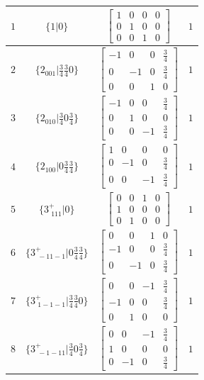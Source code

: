 \documentclass[fleqn,8pt]{jsarticle}
\begin{document}
\begin{longtable}{cccc}
$ 1 $ & $ \{1|0\} $ & $ \begin{bmatrix} 1 & 0 & 0 & 0 \\ 0 & 1 & 0 & 0 \\ 0 & 0 & 1 & 0 \end{bmatrix} $ & $ 1 $ \\ \hline
$ 2 $ & $ \{2{}_{001}|\frac{3}{4} \frac{3}{4} 0\} $ & $ \begin{bmatrix} -1 & 0 & 0 & \frac{3}{4} \\ 0 & -1 & 0 & \frac{3}{4} \\ 0 & 0 & 1 & 0 \end{bmatrix} $ & $ 1 $ \\ \hline
$ 3 $ & $ \{2{}_{010}|\frac{3}{4} 0 \frac{3}{4}\} $ & $ \begin{bmatrix} -1 & 0 & 0 & \frac{3}{4} \\ 0 & 1 & 0 & 0 \\ 0 & 0 & -1 & \frac{3}{4} \end{bmatrix} $ & $ 1 $ \\ \hline
$ 4 $ & $ \{2{}_{100}|0 \frac{3}{4} \frac{3}{4}\} $ & $ \begin{bmatrix} 1 & 0 & 0 & 0 \\ 0 & -1 & 0 & \frac{3}{4} \\ 0 & 0 & -1 & \frac{3}{4} \end{bmatrix} $ & $ 1 $ \\ \hline
$ 5 $ & $ \{3^{+}_{\,\,111}|0\} $ & $ \begin{bmatrix} 0 & 0 & 1 & 0 \\ 1 & 0 & 0 & 0 \\ 0 & 1 & 0 & 0 \end{bmatrix} $ & $ 1 $ \\ \hline
$ 6 $ & $ \{3^{+}_{\,\,-11-1}|0 \frac{3}{4} \frac{3}{4}\} $ & $ \begin{bmatrix} 0 & 0 & 1 & 0 \\ -1 & 0 & 0 & \frac{3}{4} \\ 0 & -1 & 0 & \frac{3}{4} \end{bmatrix} $ & $ 1 $ \\ \hline
$ 7 $ & $ \{3^{+}_{\,\,1-1-1}|\frac{3}{4} \frac{3}{4} 0\} $ & $ \begin{bmatrix} 0 & 0 & -1 & \frac{3}{4} \\ -1 & 0 & 0 & \frac{3}{4} \\ 0 & 1 & 0 & 0 \end{bmatrix} $ & $ 1 $ \\ \hline
$ 8 $ & $ \{3^{+}_{\,\,-1-11}|\frac{3}{4} 0 \frac{3}{4}\} $ & $ \begin{bmatrix} 0 & 0 & -1 & \frac{3}{4} \\ 1 & 0 & 0 & 0 \\ 0 & -1 & 0 & \frac{3}{4} \end{bmatrix} $ & $ 1 $ \\ \hline

\end{longtable}
\end{document}
